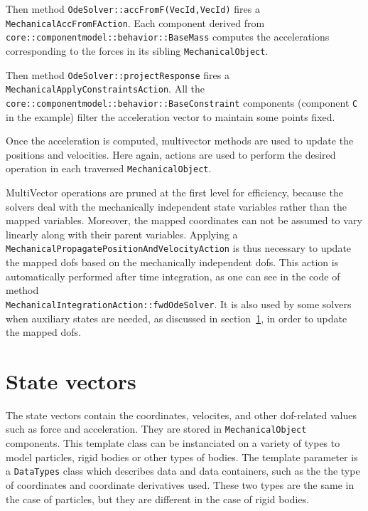 Then method \texttt{OdeSolver::accFromF(VecId,VecId)} fires a \texttt{MechanicalAccFromFAction}. Each component derived from \texttt{core::componentmodel::behavior::BaseMass} computes the accelerations corresponding to the forces in its sibling \texttt{MechanicalObject}.

Then method \texttt{OdeSolver::projectResponse} fires a \texttt{MechanicalApplyConstraintsAction}. All the \texttt{core::componentmodel::behavior::BaseConstraint} components (component \texttt{C} in the example) filter the acceleration vector to maintain some points fixed.

Once the acceleration is computed, multivector methods are used to update the positions and velocities. Here again, actions are used to perform the desired operation in each traversed \texttt{MechanicalObject}.

MultiVector operations are pruned at the first level for efficiency, because the solvers deal with the mechanically independent state variables rather than the mapped variables. 
Moreover, the mapped coordinates can not be assumed to vary linearly along with their parent variables.
Applying a \texttt{MechanicalPropagatePositionAndVelocityAction} is thus necessary to update the mapped dofs based on the mechanically independent dofs. 
This action is automatically performed after time integration, as one can see in the code of method \\ \texttt{MechanicalIntegrationAction::fwdOdeSolver}.
It is also used by some solvers when auxiliary states are needed, as discussed in section~\ref{sec:statevectors}, in order to update the mapped dofs.



\section{State vectors} \label{sec:statevectors}
The state vectors contain the coordinates, velocites, and other dof-related values such as force and acceleration.
They are stored in \texttt{MechanicalObject} components. 
This template class can be instanciated on a variety of types to model particles, rigid bodies or other types of bodies. 
The template parameter is a \texttt{DataTypes} class which describes data and data containers, such as the the type of coordinates and coordinate derivatives used. 
These two types are the same in the case of particles, but they are different in the case of rigid bodies.

